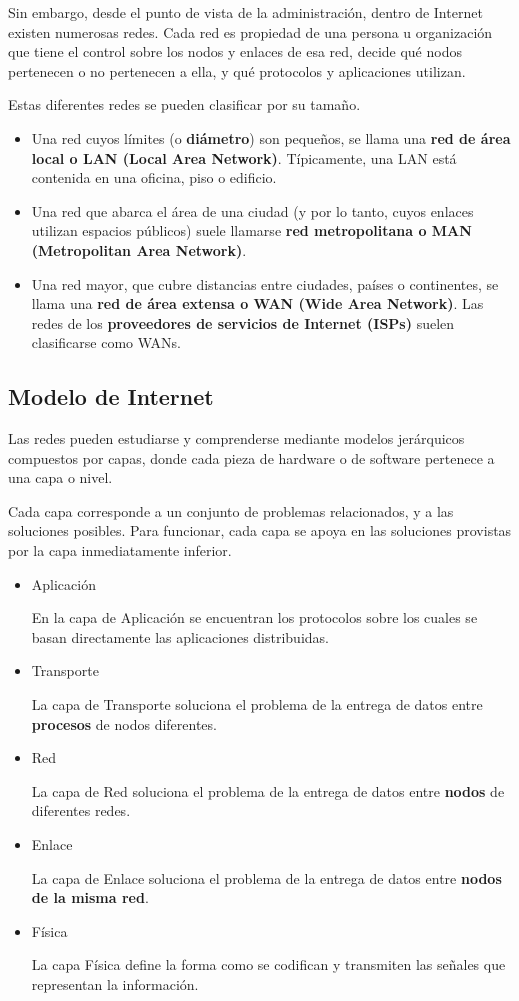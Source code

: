 \documentclass[spanish,A4,]{article}
\begin{document}
Sin embargo, desde el punto de vista de la administración, dentro de
Internet existen numerosas redes. Cada red es propiedad de una persona u
organización que tiene el control sobre los nodos y enlaces de esa red,
decide qué nodos pertenecen o no pertenecen a ella, y qué protocolos y
aplicaciones utilizan.

Estas diferentes redes se pueden clasificar por su tamaño.

\begin{itemize}
\itemsep1pt\parskip0pt
\item
  Una red cuyos límites (o \textbf{diámetro}) son pequeños, se llama una
  \textbf{red de área local o LAN (Local Area Network)}. Típicamente,
  una LAN está contenida en una oficina, piso o edificio.
\item
  Una red que abarca el área de una ciudad (y por lo tanto, cuyos
  enlaces utilizan espacios públicos) suele llamarse \textbf{red
  metropolitana o MAN (Metropolitan Area Network)}.
\item
  Una red mayor, que cubre distancias entre ciudades, países o
  continentes, se llama una \textbf{red de área extensa o WAN (Wide Area
  Network)}. Las redes de los \textbf{proveedores de servicios de
  Internet (ISPs)} suelen clasificarse como WANs.
\end{itemize}

\subsection{Modelo de Internet}\label{modelo-de-internet}

Las redes pueden estudiarse y comprenderse mediante modelos jerárquicos
compuestos por capas, donde cada pieza de hardware o de software
pertenece a una capa o nivel.

Cada capa corresponde a un conjunto de problemas relacionados, y a las
soluciones posibles. Para funcionar, cada capa se apoya en las
soluciones provistas por la capa inmediatamente inferior.

\begin{itemize}
\item
  Aplicación

  En la capa de Aplicación se encuentran los protocolos sobre los cuales
  se basan directamente las aplicaciones distribuidas.
\item
  Transporte

  La capa de Transporte soluciona el problema de la entrega de datos
  entre \textbf{procesos} de nodos diferentes.
\item
  Red

  La capa de Red soluciona el problema de la entrega de datos entre
  \textbf{nodos} de diferentes redes.
\item
  Enlace

  La capa de Enlace soluciona el problema de la entrega de datos entre
  \textbf{nodos de la misma red}.
\item
  Física

  La capa Física define la forma como se codifican y transmiten las
  señales que representan la información.
\end{itemize}
\end{document}
